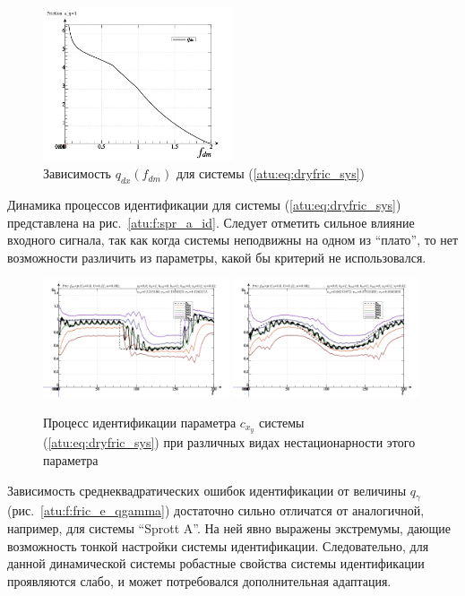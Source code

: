 \documentclass[a4paper,12pt]{article}
\begin{document}
\begin{figure}[htb!]
\centerline{
  \includegraphics[width=0.50\textwidth]{p/cha/fric/fric_p-p_f_dm_q.png}
}
  \caption{Зависимость $q_{dx}(f_{dm})$ для системы (\ref{atu:eq:dryfric_sys}) }
\label{atu:f:fric_q}
\end{figure}


Динамика процессов идентификации для системы (\ref{atu:eq:dryfric_sys}) представлена на рис.~\ref{atu:f:spr_a_id}.
Следует отметить сильное влияние входного сигнала, так как когда системы неподвижны
на одном из ``плато'', то нет возможности различить из параметры,
какой бы критерий не использовался.

\begin{figure}[htb!]
\centerline{
  \includegraphics[width=0.49\textwidth]{p/cha/fric/fric_m5p-pl_n_sign.png}
  \includegraphics[width=0.49\textwidth]{p/cha/fric/fric_m5p-pl_n_sin.png}
}
\caption{Процесс идентификации параметра $c_{x_y} $ системы (\ref{atu:eq:dryfric_sys})
  при различных видах нестационарности этого параметра
}
\label{atu:f:fric_id}
\end{figure}

Зависимость среднеквадратических ошибок идентификации от величины $q_\gamma$ (рис.~\ref{atu:f:fric_e_qgamma})
достаточно сильно отличатся от аналогичной, например, для системы ``Sprott A''. На ней явно выражены
экстремумы, дающие возможность тонкой настройки системы идентификации. Следовательно,
для данной динамической системы робастные свойства системы идентификации проявляются слабо,
и может потребовался дополнительная адаптация.
\end{document}
